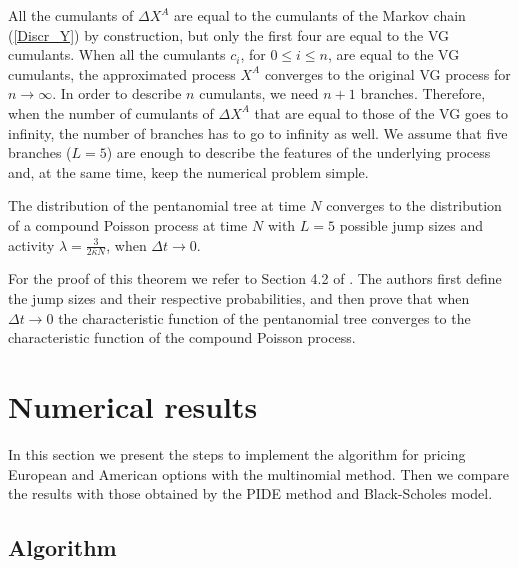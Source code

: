 \begin{Remark}
All the cumulants of $\Delta X^A$ are equal to the cumulants of the Markov chain (\ref{Discr_Y}) by construction, but only the first four are equal to the VG cumulants.
When all the cumulants $c_i$, for $0 \leq i \leq n$, are equal to the VG cumulants, the approximated process $X^A$ converges to
the original VG process for $n \to \infty$.
In order to describe $n$ cumulants, we need $n+1$ branches. Therefore, when the number of cumulants of $\Delta X^A$ that are equal to those of the VG goes to infinity, 
the number of branches has to go to infinity as well.
We assume that five branches ($L=5$) are enough to describe the features of the underlying process and, at the same time, keep the numerical
problem simple. 
\end{Remark}

\begin{Theorem}
The distribution of the pentanomial tree at time $N$ converges to the distribution of a compound Poisson process at time $N$ with $L=5$ possible jump sizes and activity $\lambda = \frac{3}{2 \bar \kappa N}$, when $\Delta t \to 0$.   
\end{Theorem}
For the proof of this theorem  
we refer to Section 4.2 of \cite{YaPr06}. The authors first define the jump sizes and their respective probabilities, and then
prove that when $\Delta t \to 0$ the characteristic function of the pentanomial tree converges to the 
characteristic function of the compound Poisson process.



\section{Numerical results} \label{sec4_ch3}

In this section we present the steps to implement the algorithm for pricing European and American options with the multinomial method.
Then we compare the results with those obtained by the PIDE method and Black-Scholes model.

\subsection{Algorithm}

